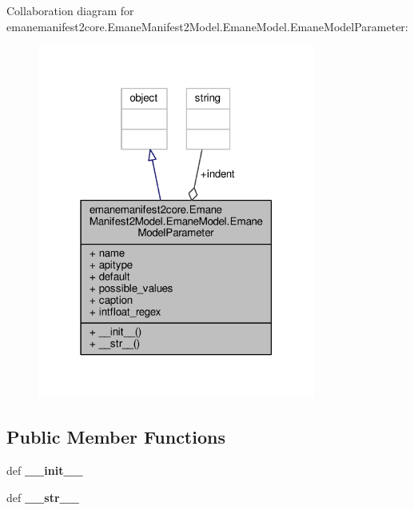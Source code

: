 Collaboration diagram for emanemanifest2core.\+Emane\+Manifest2\+Model.\+Emane\+Model.\+Emane\+Model\+Parameter\+:
\nopagebreak
\begin{figure}[H]
\begin{center}
\leavevmode
\includegraphics[width=259pt]{classemanemanifest2core_1_1_emane_manifest2_model_1_1_emane_model_1_1_emane_model_parameter__coll__graph}
\end{center}
\end{figure}
\subsection*{Public Member Functions}
\begin{DoxyCompactItemize}
\item 
\hypertarget{classemanemanifest2core_1_1_emane_manifest2_model_1_1_emane_model_1_1_emane_model_parameter_acd4e11bdae0c1a50d6cf7bee1f00d765}{def {\bfseries \+\_\+\+\_\+init\+\_\+\+\_\+}}\label{classemanemanifest2core_1_1_emane_manifest2_model_1_1_emane_model_1_1_emane_model_parameter_acd4e11bdae0c1a50d6cf7bee1f00d765}

\item 
\hypertarget{classemanemanifest2core_1_1_emane_manifest2_model_1_1_emane_model_1_1_emane_model_parameter_a2b5c94b44991e58fc4c508ab957b9aec}{def {\bfseries \+\_\+\+\_\+str\+\_\+\+\_\+}}\label{classemanemanifest2core_1_1_emane_manifest2_model_1_1_emane_model_1_1_emane_model_parameter_a2b5c94b44991e58fc4c508ab957b9aec}

\end{DoxyCompactItemize}
